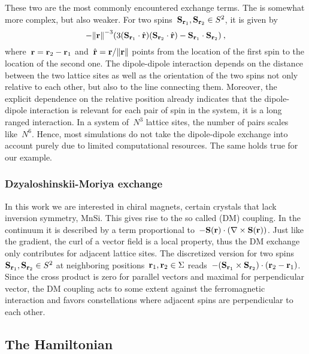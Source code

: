 These two are the most commonly encountered exchange terms. The
 is somewhat more complex, but also weaker.
For two spins~$\mathbf{S}_{\mathbf{r}_1}, \mathbf{S}_{\mathbf{r}_2} \in S^2$, it is given by
%
\begin{equation}
  - {\norm{\r}^{-3}} (3 (\S_{\r_1} \cdot \hat{\r})
  (\S_{\r_2} \cdot \hat{\r}) - \S_{\r_1} \cdot \S_{\r_2})\:,
\end{equation}
%
where~$\mathbf{r} = \mathbf{r}_2 - \mathbf{r}_1$ and~$\hat{\r} = \r / \norm{\r}$ points from the
location of the first spin to the location of the second one. The dipole-dipole
interaction depends on the distance between the two lattice sites as well as the
orientation of the two spins not only relative to each other, but also to the
line connecting them. Moreover, the explicit dependence on the relative position
already indicates that the dipole-dipole interaction is relevant for each pair
of spin in the system, it is a long ranged interaction. In a system of~$N^3$
lattice sites, the number of pairs scales like~$N^6$. Hence, most simulations do
not take the dipole-dipole exchange into account purely due to limited
computational resources. The same holds true for our example.

\subsubsection{Dzyaloshinskii-Moriya exchange}

In this work we are interested in chiral magnets, certain crystals that lack
inversion symmetry, \eg{} MnSi. This gives rise to the so called  (DM) coupling. In the continuum it is described by a term
proportional to~$-\mathbf{S}(\mathbf{r}) \cdot (\nabla \times \mathbf{S}(\mathbf{r}))$. Just like the gradient,
the curl of a vector field is a local property, thus the DM exchange only
contributes for adjacent lattice sites. The discretized version for two
spins~$\mathbf{S}_{\mathbf{r}_1}, \mathbf{S}_{\mathbf{r}_2} \in S^2$ at neighboring positions~$\mathbf{r}_1, \mathbf{r}_2 \in
\Sigma$ reads~$- (\mathbf{S}_{\mathbf{r}_1} \times \mathbf{S}_{\mathbf{r}_2}) \cdot (\mathbf{r}_2 - \mathbf{r}_1)$.  Since the
cross product is zero for parallel vectors and maximal for perpendicular vector,
the DM coupling acts to some extent against the ferromagnetic interaction and
favors constellations where adjacent spins are perpendicular to each other.


\subsection{The Hamiltonian}

